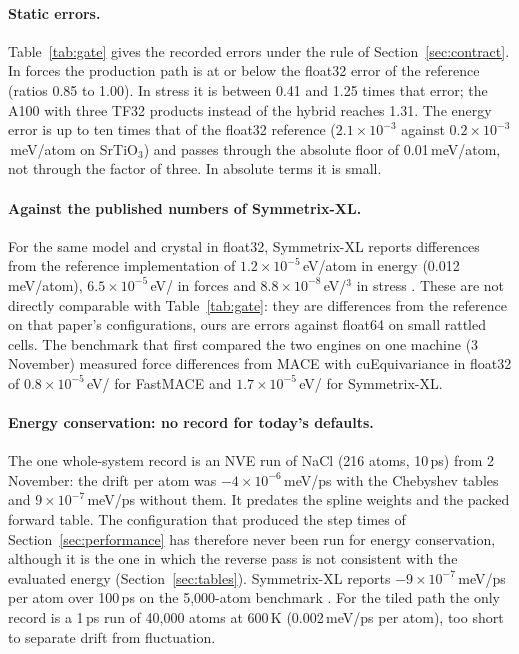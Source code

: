\documentclass[11pt]{article}
\newcommand{\angstrom}{\text{\AA}}
\begin{document}
\paragraph{Static errors.}
Table~\ref{tab:gate} gives the recorded errors under the rule of Section~\ref{sec:contract}. In forces the
production path is at or below the float32 error of the reference (ratios 0.85 to 1.00). In stress it is between
0.41 and 1.25 times that error; the A100 with three TF32 products instead of the hybrid reaches 1.31. The energy
error is up to ten times that of the float32 reference ($2.1\times10^{-3}$ against $0.2\times10^{-3}$\,meV/atom
on SrTiO$_3$) and passes through the absolute floor of 0.01\,meV/atom, not through the factor of three. In
absolute terms it is small.

\paragraph{Against the published numbers of Symmetrix-XL.}
For the same model and crystal in float32, Symmetrix-XL reports differences from the reference implementation of
$1.2\times10^{-5}$\,eV/atom in energy (0.012\,meV/atom), $6.5\times10^{-5}$\,eV/\angstrom{} in forces and
$8.8\times10^{-8}$\,eV/\angstrom$^3$ in stress \cite{fu2026symmetrixxl}. These are not directly comparable with
Table~\ref{tab:gate}: they are differences from the reference on that paper's configurations, ours are errors
against float64 on small rattled cells. The benchmark that first compared the two engines on one machine
(3 November) measured force differences from MACE with cuEquivariance in float32 of
$0.8\times10^{-5}$\,eV/\angstrom{} for FastMACE and $1.7\times10^{-5}$\,eV/\angstrom{} for Symmetrix-XL.

\paragraph{Energy conservation: no record for today's defaults.}
The one whole-system record is an NVE run of NaCl (216 atoms, 10\,ps) from 2 November: the drift per atom was
$-4\times10^{-6}$\,meV/ps with the Chebyshev tables and $9\times10^{-7}$\,meV/ps without them. It predates the
spline weights and the packed forward table. The configuration that produced the step times of
Section~\ref{sec:performance} has therefore never been run for energy conservation, although it is the one in
which the reverse pass is not consistent with the evaluated energy (Section~\ref{sec:tables}). Symmetrix-XL
reports
$-9\times10^{-7}$\,meV/ps per atom over 100\,ps on the 5{,}000-atom benchmark \cite{fu2026symmetrixxl}. For the
tiled path the only record is a 1\,ps run of 40{,}000 atoms at 600\,K (0.002\,meV/ps per atom), too short to
separate drift from fluctuation.
\end{document}
